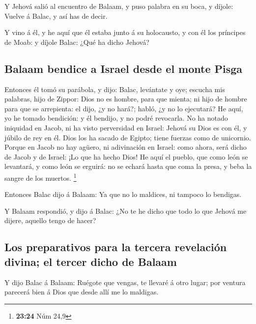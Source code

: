  Y Jehová salió al encuentro de Balaam, y puso palabra en
su boca, y díjole: Vuelve á Balac, y así has de decir.

 Y vino á él, y he aquí que él estaba junto á su
holocausto, y con él los príncipes de Moab: y díjole Balac: ¿Qué ha
dicho Jehová?

\hypertarget{balaam-bendice-a-israel-desde-el-monte-pisga}{%
\subsection{Balaam bendice a Israel desde el monte
Pisga}\label{balaam-bendice-a-israel-desde-el-monte-pisga}}

 Entonces él tomó su parábola, y dijo: Balac, levántate y
oye; escucha mis palabras, hijo de Zippor:  Dios no es
hombre, para que mienta; ni hijo de hombre para que se arrepienta: el
dijo, ¿y no hará?; habló, ¿y no lo ejecutará?  He aquí,
yo he tomado bendición: y él bendijo, y no podré revocarla.
 No ha notado iniquidad en Jacob, ni ha visto perversidad
en Israel: Jehová su Dios es con él, y júbilo de rey en él.
 Dios los ha sacado de Egipto; tiene fuerzas como de
unicornio.  Porque en Jacob no hay agüero, ni adivinación
en Israel: como ahora, será dicho de Jacob y de Israel: ¡Lo que ha hecho
Dios!  He aquí el pueblo, que como león se levantará, y
como león se erguirá: no se echará hasta que coma la presa, y beba la
sangre de los muertos. \footnote{\textbf{23:24} Núm 24,9}

 Entonces Balac dijo á Balaam: Ya que no lo maldices, ni
tampoco lo bendigas.

 Y Balaam respondió, y dijo á Balac: ¿No te he dicho que
todo lo que Jehová me dijere, aquello tengo de hacer?

\hypertarget{los-preparativos-para-la-tercera-revelaciuxf3n-divina-el-tercer-dicho-de-balaam}{%
\subsection{Los preparativos para la tercera revelación divina; el
tercer dicho de
Balaam}\label{los-preparativos-para-la-tercera-revelaciuxf3n-divina-el-tercer-dicho-de-balaam}}

 Y dijo Balac á Balaam: Ruégote que vengas, te llevaré á
otro lugar; por ventura parecerá bien á Dios que desde allí me lo
maldigas.

